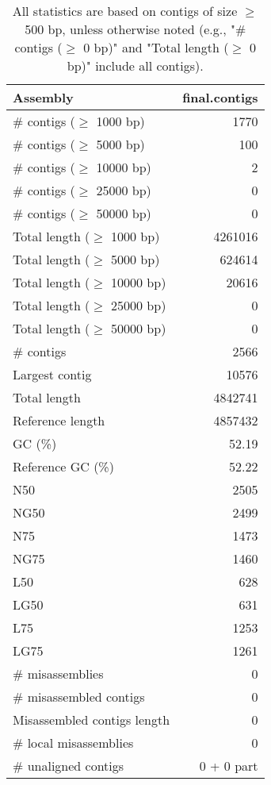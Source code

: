 \documentclass[12pt,a4paper]{article}
\begin{document}
\begin{table}[ht]
\begin{center}
\caption{All statistics are based on contigs of size $\geq$ 500 bp, unless otherwise noted (e.g., "\# contigs ($\geq$ 0 bp)" and "Total length ($\geq$ 0 bp)" include all contigs).}
\begin{tabular}{|l*{1}{|r}|}
\hline
Assembly & final.contigs \\ \hline
\# contigs ($\geq$ 1000 bp) & 1770 \\ \hline
\# contigs ($\geq$ 5000 bp) & 100 \\ \hline
\# contigs ($\geq$ 10000 bp) & 2 \\ \hline
\# contigs ($\geq$ 25000 bp) & 0 \\ \hline
\# contigs ($\geq$ 50000 bp) & 0 \\ \hline
Total length ($\geq$ 1000 bp) & 4261016 \\ \hline
Total length ($\geq$ 5000 bp) & 624614 \\ \hline
Total length ($\geq$ 10000 bp) & 20616 \\ \hline
Total length ($\geq$ 25000 bp) & 0 \\ \hline
Total length ($\geq$ 50000 bp) & 0 \\ \hline
\# contigs & 2566 \\ \hline
Largest contig & 10576 \\ \hline
Total length & 4842741 \\ \hline
Reference length & 4857432 \\ \hline
GC (\%) & 52.19 \\ \hline
Reference GC (\%) & 52.22 \\ \hline
N50 & 2505 \\ \hline
NG50 & 2499 \\ \hline
N75 & 1473 \\ \hline
NG75 & 1460 \\ \hline
L50 & 628 \\ \hline
LG50 & 631 \\ \hline
L75 & 1253 \\ \hline
LG75 & 1261 \\ \hline
\# misassemblies & 0 \\ \hline
\# misassembled contigs & 0 \\ \hline
Misassembled contigs length & 0 \\ \hline
\# local misassemblies & 0 \\ \hline
\# unaligned contigs & 0 + 0 part \\ \hline

\end{tabular}
\end{center}
\end{table}
\end{document}
